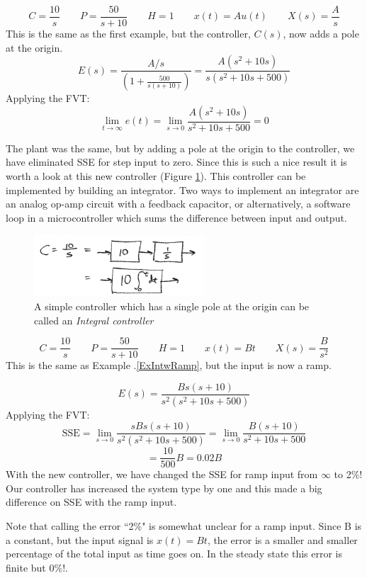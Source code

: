 \begin{ExampleSmall}\label{ExIntwRamp}

\[
C = \frac{10}{s} \qquad P = \frac{50}{s+10} \qquad H = 1 \qquad x(t) = Au(t) \qquad X(s) = \frac{A}{s}
\]
This is the same as the first example, but the controller, $C(s)$, now adds a pole at the origin.
 \[
E(s) = \frac{A/s}{(1+\frac{500}{s(s+10)})} = \frac{A(s^2+10s)}{s(s^2+10s+500)}
\]
Applying the FVT:
\[
\lim_{t\to\infty} e(t) = \lim_{s\to 0} \frac{A(s^2+10s)}{s^2+10s+500} = 0
\]

The plant was the same, but by adding a pole at the  origin to the controller, we have eliminated SSE for step input to zero.
Since this is such a nice result it is worth a look at this new controller (Figure \ref{SimpleIntegralController}).
This controller can be implemented by building an integrator.  Two ways to implement an integrator are an analog op-amp circuit with a feedback capacitor, 
or alternatively, a software loop in a microcontroller which sums the difference between input and output.

\end{ExampleSmall}


\begin{figure}\centering
\includegraphics[width=2.5in]{figs09/00786a.png}
\caption{A simple controller which has a single pole at the origin can be called an {\it Integral controller}}\label{SimpleIntegralController}
\end{figure}





\begin{ExampleSmall}\label{ExIntegwithRamp}
\[
C = \frac{10}{s} \qquad P = \frac{50}{s+10} \qquad H = 1 \qquad x(t) = Bt \qquad X(s) = \frac{B}{s^2}
\]
This is the same as Example \thechapter.\ref{ExIntwRamp}, but the input is now a ramp.

\[
E(s) = \frac{Bs(s+10)}{s^2(s^2+10s+500)}
\]
Applying the FVT:
\[
\mathrm{SSE} = \lim_{s\to 0} \frac{sBs(s+10)}{s^2(s^2+10s+500)} = \lim_{s\to 0} \frac{B(s+10)}{s^2+10s+500}
\]
\[
= \frac{10}{500}B = 0.02B
\]
With the new controller, we have changed the SSE for ramp input from $\infty$ to 2\%!   Our controller has increased the system type by one and this made a big difference on SSE with the ramp input.

Note that calling the error ``2\%" is somewhat unclear for a ramp input.  Since B is a constant, but the input signal is $x(t) = Bt$, the error is a smaller and smaller percentage of the total input as time goes on.  In the steady state this error is finite but $0\%$!.

\end{ExampleSmall}



